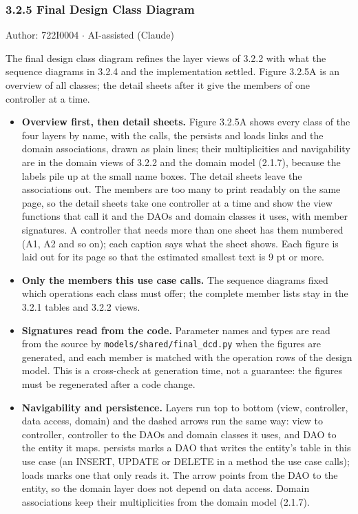 \subsubsection*{3.2.5 Final Design Class Diagram}
Author: 722I0004 \ensuremath{\cdot} AI-assisted (Claude)

The final design class diagram refines the layer views of 3.2.2 with what the sequence diagrams in 3.2.4 and the implementation settled. Figure 3.2.5A is an overview of all classes; the detail sheets after it give the members of one controller at a time.

\begin{itemize}
\item \textbf{Overview first, then detail sheets.} Figure 3.2.5A shows every class of the four layers by name, with the calls, the \guillemotleft{}persists\guillemotright{} and \guillemotleft{}loads\guillemotright{} links and the domain associations, drawn as plain lines; their multiplicities and navigability are in the domain views of 3.2.2 and the domain model (2.1.7), because the labels pile up at the small name boxes. The detail sheets leave the associations out. The members are too many to print readably on the same page, so the detail sheets take one controller at a time and show the view functions that call it and the DAOs and domain classes it uses, with member signatures. A controller that needs more than one sheet has them numbered (A1, A2 and so on); each caption says what the sheet shows. Each figure is laid out for its page so that the estimated smallest text is 9 pt or more.

\item \textbf{Only the members this use case calls.} The sequence diagrams fixed which operations each class must offer; the complete member lists stay in the 3.2.1 tables and 3.2.2 views.

\item \textbf{Signatures read from the code.} Parameter names and types are read from the source by \texttt{models/\allowbreak{}shared/\allowbreak{}final\_\allowbreak{}dcd.\allowbreak{}py} when the figures are generated, and each member is matched with the operation rows of the design model. This is a cross-check at generation time, not a guarantee: the figures must be regenerated after a code change.

\item \textbf{Navigability and persistence.} Layers run top to bottom (view, controller, data access, domain) and the dashed arrows run the same way: view to controller, controller to the DAOs and domain classes it uses, and DAO to the entity it maps. \guillemotleft{}persists\guillemotright{} marks a DAO that writes the entity's table in this use case (an INSERT, UPDATE or DELETE in a method the use case calls); \guillemotleft{}loads\guillemotright{} marks one that only reads it. The arrow points from the DAO to the entity, so the domain layer does not depend on data access. Domain associations keep their multiplicities from the domain model (2.1.7).

\end{itemize}
